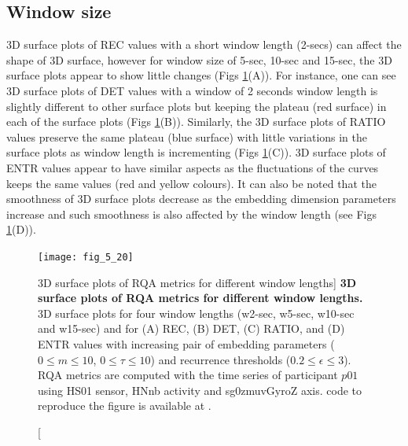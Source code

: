 \subsection{Window size}
3D surface plots of REC values with a short window length (2-secs) 
can affect the shape of 3D surface, however for window size of 
5-sec, 10-sec and 15-sec, the 3D surface plots appear to show little changes 
(Figs \ref{fig:topo_windows_hii}(A)).
For instance, one can see 3D surface plots of DET values with a window of 
2 seconds window length is slightly different to other surface plots but 
keeping the plateau (red surface) in each of the surface plots
(Figs \ref{fig:topo_windows_hii}(B)).
Similarly, the 3D surface plots of RATIO values preserve the same plateau 
(blue surface) with little variations in the surface plots as window length 
is incrementing (Figs \ref{fig:topo_windows_hii}(C)).
3D surface plots of ENTR values appear to have similar aspects as the 
fluctuations of the curves keeps the same values (red and yellow colours).
It can also be noted that the smoothness of 3D surface plots decrease as the 
embedding dimension parameters increase and such smoothness is also affected 
by the window length (see Figs \ref{fig:topo_windows_hii}(D)).

\begin{figure}
\centering
\texttt{[image: fig\_5\_20]}
    \caption
	[3D surface plots of RQA metrics for different window lengths]{
	{\bf 3D surface plots of RQA metrics for different window lengths.}
	3D surface plots for four window lengths (w2-sec, w5-sec, w10-sec and  w15-sec)
	and for (A) REC, (B) DET, (C) RATIO, and (D) ENTR values
	with increasing pair of embedding parameters 
	($0 \le m \le 10$, $0 \le \tau \le 10$) 
	and recurrence thresholds ($ 0.2 \le \epsilon \le 3 $).
	RQA metrics are computed with the time series of participant $p01$ 
	using HS01 sensor, HNnb activity and sg0zmuvGyroZ axis.
	\R code to reproduce the figure is available at 
	.
       }
\label{fig:topo_windows_hii}
\end{figure}

